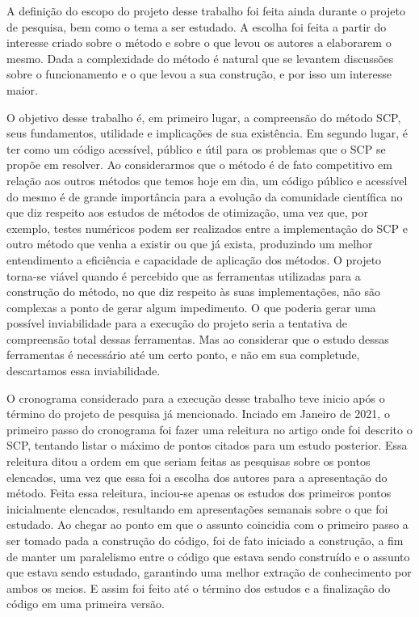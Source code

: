 A definição do escopo do projeto desse trabalho foi feita ainda durante o projeto de pesquisa, bem como o tema a ser estudado. A escolha foi feita a partir do interesse criado sobre o método e sobre o que levou os autores a elaborarem o mesmo. Dada a complexidade do método é natural que se levantem discussões sobre o funcionamento e o que levou a sua construção, e por isso um interesse maior.

O objetivo desse trabalho é, em primeiro lugar, a compreensão do método SCP, seus fundamentos, utilidade e implicações de sua existência. Em segundo lugar, é ter como um código acessível, público e útil para os problemas que o SCP se propõe em resolver. Ao considerarmos que o método é de fato competitivo em relação aos outros métodos que temos hoje em dia, um código público e acessível do mesmo é de grande importância para a evolução da comunidade científica no que diz respeito aos estudos de métodos de otimização, uma vez que, por exemplo, testes numéricos podem ser realizados entre a implementação do SCP e outro método que venha a existir ou que já exista, produzindo um melhor entendimento a eficiência e capacidade de aplicação dos métodos. O projeto torna-se viável quando é percebido que as ferramentas utilizadas para a construção do método, no que diz respeito às suas implementações, não são complexas a ponto de gerar algum impedimento. O que poderia gerar uma possível inviabilidade para a execução do projeto seria a tentativa de compreensão total dessas ferramentas. Mas ao considerar que o estudo dessas ferramentas é necessário até um certo ponto, e não em sua completude, descartamos essa inviabilidade.

O cronograma considerado para a execução desse trabalho teve inicio após o término do projeto de pesquisa já mencionado. Inciado em Janeiro de 2021, o primeiro passo do cronograma foi fazer uma releitura no artigo onde foi descrito o SCP, tentando listar o máximo de pontos citados para um estudo posterior. Essa releitura ditou a ordem em que seriam feitas as pesquisas sobre os pontos elencados, uma vez que essa foi a escolha dos autores para a apresentação do método. Feita essa releitura, inciou-se apenas os estudos dos primeiros pontos inicialmente elencados, resultando em apresentações semanais sobre o que foi estudado. Ao chegar ao ponto em que o assunto coincidia com o primeiro passo a ser tomado pada a construção do código, foi de fato iniciado a construção, a fim de manter um paralelismo entre o código que estava sendo construído e o assunto que estava sendo estudado, garantindo uma melhor extração de conhecimento por ambos os meios. E assim foi feito até o término dos estudos e a finalização do código em uma primeira versão.

